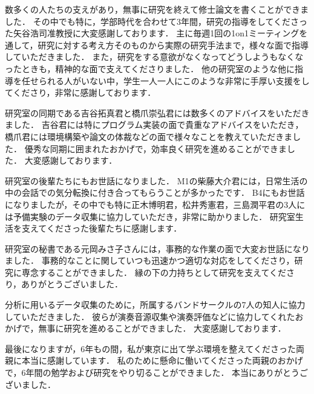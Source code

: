 
\begin{acknowledgements}  
数多くの人たちの支えがあり，無事に研究を終えて修士論文を書くことができました．
その中でも特に，学部時代を合わせて3年間，研究の指導をしてくださった矢谷浩司准教授に大変感謝しております．
主に毎週1回の1on1ミーティングを通して，研究に対する考え方そのものから実際の研究手法まで，様々な面で指導していただきました．
また，研究をする意欲がなくなってどうしようもなくなったときも，精神的な面で支えてくださりました．
他の研究室のような他に指導を任せられる人がいない中，学生一人一人にこのような非常に手厚い支援をしてくださり，非常に感謝しております．\par

研究室の同期である吉谷拓真君と橋爪崇弘君には数多くのアドバイスをいただきました．
吉谷君には特にプログラム実装の面で貴重なアドバイスをいただき，
橋爪君には環境構築や論文の体裁などの面で様々なことを教えていただきました．
優秀な同期に囲まれたおかげで，効率良く研究を進めることができました．
大変感謝しております．\par

研究室の後輩たちにもお世話になりました．
M1の柴藤大介君には，日常生活の中の会話での気分転換に付き合ってもらうことが多かったです．
B4にもお世話になりましたが，その中でも特に正木博明君，松井秀憲君，三島潤平君の3人には予備実験のデータ収集に協力していただき，非常に助かりました．
研究室生活を支えてくださった後輩たちに感謝します．\par

研究室の秘書である元岡みさ子さんには，事務的な作業の面で大変お世話になりました．
事務的なことに関していつも迅速かつ適切な対応をしてくださり，研究に専念することができました．
縁の下の力持ちとして研究を支えてくださり，ありがとうございました．\par

分析に用いるデータ収集のために，所属するバンドサークルの7人の知人に協力していただきました．
彼らが演奏音源収集や演奏評価などに協力してくれたおかげで，無事に研究を進めることができました．
大変感謝しております．

最後になりますが，6年もの間，私が東京に出て学ぶ環境を整えてくださった両親に本当に感謝しています．
私のために懸命に働いてくださった両親のおかげで，6年間の勉学および研究をやり切ることができました．
本当にありがとうございました．

\end{acknowledgements}
